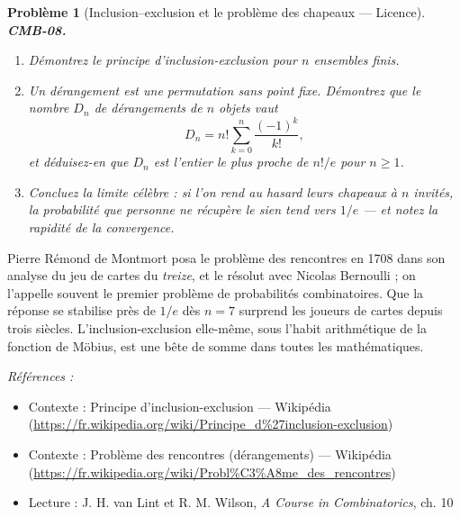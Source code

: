 \documentclass[11pt]{article}
\newtheorem{problem}{Problème}
\newenvironment{refs}{\par\small\noindent\emph{Références :}\begin{itemize}\setlength\itemsep{0pt}}{\end{itemize}\normalsize}
\begin{document}
\bigskip

\begin{problem}[{Inclusion--exclusion et le problème des chapeaux --- Licence}]
\textbf{CMB-08.} \begin{enumerate}
\item[(a)] Démontrez le principe d'inclusion-exclusion pour $ n $ ensembles finis.
\item[(b)] Un dérangement est une permutation sans point fixe. Démontrez que le nombre $ D_n $ de
dérangements de $ n $ objets vaut
\[ D_n = n! \sum_{k=0}^{n} \frac{(-1)^k}{k!}, \]
et déduisez-en que $ D_n $ est l'entier le plus proche de $ n!/e $ pour $ n \ge 1 $.
\item[(c)] Concluez la limite célèbre : si l'on rend au hasard leurs chapeaux à $ n $ invités, la
probabilité que personne ne récupère le sien tend vers $ 1/e $ --- et notez la rapidité de la
convergence.
\end{enumerate}

\end{problem}

\noindent Pierre Rémond de Montmort posa le problème des rencontres en 1708 dans son
analyse du jeu de cartes du \textit{treize}, et le résolut avec Nicolas Bernoulli ; on l'appelle
souvent le premier problème de probabilités combinatoires. Que la réponse se stabilise près de
$ 1/e $ dès $ n = 7 $ surprend les joueurs de cartes depuis trois siècles.
L'inclusion-exclusion elle-même, sous l'habit arithmétique de la fonction de Möbius, est une bête
de somme dans toutes les mathématiques.

\begin{refs}
\item Contexte : Principe d'inclusion-exclusion --- Wikipédia (\url{https://fr.wikipedia.org/wiki/Principe_d%27inclusion-exclusion})
\item Contexte : Problème des rencontres (dérangements) --- Wikipédia (\url{https://fr.wikipedia.org/wiki/Probl%C3%A8me_des_rencontres})
\item Lecture : J. H. van Lint et R. M. Wilson, \textit{A Course in Combinatorics}, ch. 10
\end{refs}

\bigskip
\end{document}
